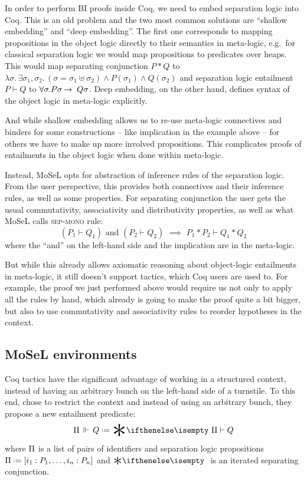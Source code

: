 In order to perform BI proofs inside Coq, we need to embed separation logic into Coq.
This is an old problem and the two most common solutions are ``shallow embedding'' and ``deep embedding''.
The first one corresponds to mapping propositions in the object logic directly to their semantics in meta-logic, e.g.\ for classical separation logic we would map propositions to predicates over heaps.
This would map separating conjunction \(P * Q\) to \(\lambda \sigma.\,\exists\sigma_1, \sigma_2.\, \left(\sigma = \sigma_1 \uplus \sigma_2\right) \wedge P (\sigma_1) \wedge Q(\sigma_2)\) and separation logic entailment \(P \vdash Q\) to \(\forall \sigma. P \sigma \mathbin{\rightarrow}~ Q \sigma\).
Deep embedding, on the other hand, defines syntax of the object logic in meta-logic explicitly.

And while shallow embedding allows us to re-use meta-logic connectives and binders for some constructions -- like implication in the example above -- for others we have to make up more involved propositions.
This complicates proofs of entailments in the object logic when done within meta-logic.

Instead, MoSeL opts for abstraction of inference rules of the separation logic.
From the user perspective, this provides both connectives and their inference rules, as well as some properties.
For separating conjunction the user gets the usual commutativity, associativity and distributivity properties, as well as what MoSeL calls \textsc{sep-mono} rule:
\[(P_1 \vdash Q_1) \text{ and } (P_2 \vdash Q_2) \,\, \implies \,\, P_1 * P_2 \vdash Q_1 * Q_2\]
where the ``and'' on the left-hand side and the implication are in the meta-logic.

But while this already allows axiomatic reasoning about object-logic entailments in meta-logic, it still doesn't support tactics, which Coq users are used to.
For example, the proof we just performed above would require us not only to apply all the rules by hand, which already is going to make the proof quite a bit bigger, but also to
use commutativity and associativity rules to reorder hypotheses in the context.

\subsection{MoSeL environments}
\label{sec:mosel-environments}

Coq tactics have the significant advantage of working in a structured context, instead of having an arbitrary bunch on the left-hand side of a turnstile.
To this end, \citet{krebbersInteractiveProofsHigherorder2017} chose to restrict the context and instead of using an arbitrary bunch, they propose a new entailment predicate:
\[\entailsOneD Q \defeq \Sep \Pi \vdash Q\]
where \(\Pi\) is a list of pairs of identifiers and separation logic propositions \(\SpatD \defeq \left[i_1 : P_1, \ldots , i_n : P_n \right]\) and \(\Sep\) is an iterated separating conjunction.

